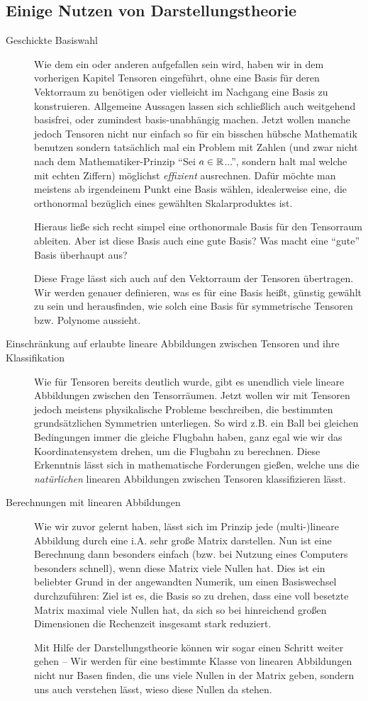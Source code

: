 
\subsection{Einige Nutzen von Darstellungstheorie}
\begin{description}
\item[Geschickte Basiswahl]
Wie dem ein oder anderen aufgefallen sein wird, haben wir in dem vorherigen Kapitel Tensoren eingeführt, ohne eine Basis für deren Vektorraum zu benötigen oder vielleicht im Nachgang eine Basis zu konstruieren. Allgemeine Aussagen lassen sich schließlich auch weitgehend basisfrei, oder zumindest basis-unabhängig machen. 
Jetzt wollen manche jedoch Tensoren nicht nur einfach so für ein bisschen hübsche Mathematik benutzen sondern tatsächlich mal ein Problem mit Zahlen (und zwar nicht nach dem Mathematiker-Prinzip \enquote{Sei $a\in \mathbb{R}$...}, sondern halt mal welche mit echten Ziffern) möglichst \emph{effizient} ausrechnen. Dafür möchte man meistens ab irgendeinem Punkt eine Basis wählen, idealerweise eine, die orthonormal bezüglich eines gewählten Skalarproduktes ist.

\medbreak
Hieraus ließe sich recht simpel eine orthonormale Basis für den Tensorraum ableiten. Aber ist diese Basis auch eine gute Basis? Was macht eine \enquote{gute} Basis überhaupt aus?

Diese Frage lässt sich auch auf den Vektorraum der Tensoren übertragen. Wir werden genauer definieren, was es für eine Basis heißt, günstig gewählt zu sein und herausfinden, wie solch eine Basis für symmetrische Tensoren bzw. Polynome aussieht.

\item[Einschränkung auf erlaubte lineare Abbildungen zwischen Tensoren und ihre Klassifikation]
Wie für Tensoren bereits deutlich wurde, gibt es unendlich viele lineare Abbildungen zwischen den Tensorräumen. Jetzt wollen wir mit Tensoren jedoch meistens physikalische Probleme beschreiben, die bestimmten grundsätzlichen Symmetrien unterliegen. So wird z.B. ein Ball bei gleichen Bedingungen immer die gleiche Flugbahn haben, ganz egal wie wir das Koordinatensystem drehen, um die Flugbahn zu berechnen. Diese Erkenntnis lässt sich in mathematische Forderungen gießen, welche uns die \emph{natürlichen} linearen Abbildungen zwischen Tensoren klassifizieren lässt.

\item[Berechnungen mit linearen Abbildungen]
Wie wir zuvor gelernt haben, lässt sich im Prinzip jede (multi-)lineare Abbildung durch eine i.A. sehr große Matrix darstellen. Nun ist eine Berechnung dann besonders einfach (bzw. bei Nutzung eines Computers besonders schnell), wenn diese Matrix viele Nullen hat. Dies ist ein beliebter Grund in der angewandten Numerik, um einen Basiswechsel durchzuführen: Ziel ist es, die Basis so zu drehen, dass eine voll besetzte Matrix maximal viele Nullen hat, da sich so bei hinreichend großen Dimensionen die Rechenzeit insgesamt stark reduziert. 

Mit Hilfe der Darstellungstheorie können wir sogar einen Schritt weiter gehen -- Wir werden für eine bestimmte Klasse von linearen Abbildungen nicht nur Basen finden, die uns viele Nullen in der Matrix geben, sondern uns auch verstehen lässt, wieso diese Nullen da stehen.
\end{description}